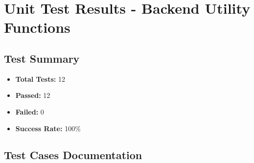 \documentclass{article}
\begin{document}
\section*{Unit Test Results - Backend Utility Functions}

\subsection*{Test Summary}
\begin{itemize}
    \item \textbf{Total Tests:} 12
    \item \textbf{Passed:} 12
    \item \textbf{Failed:} 0
    \item \textbf{Success Rate:} 100\%
\end{itemize}

\subsection*{Test Cases Documentation}
\end{document}
